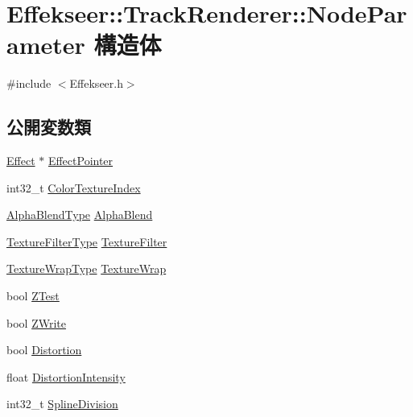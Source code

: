 \hypertarget{struct_effekseer_1_1_track_renderer_1_1_node_parameter}{}\section{Effekseer\+:\+:Track\+Renderer\+:\+:Node\+Parameter 構造体}
\label{struct_effekseer_1_1_track_renderer_1_1_node_parameter}


{\ttfamily \#include $<$Effekseer.\+h$>$}

\subsection*{公開変数類}
\begin{DoxyCompactItemize}
\item 
\mbox{\hyperlink{class_effekseer_1_1_effect}{Effect}} $\ast$ \mbox{\hyperlink{struct_effekseer_1_1_track_renderer_1_1_node_parameter_a00ceee28cf8cea7044e4ad1f57b77638}{Effect\+Pointer}}
\item 
int32\+\_\+t \mbox{\hyperlink{struct_effekseer_1_1_track_renderer_1_1_node_parameter_af56f97c8a66ba32dcbdd511de20101bd}{Color\+Texture\+Index}}
\item 
\mbox{\hyperlink{namespace_effekseer_a8c32fd5b7ec7feed73314b2ae8086949}{Alpha\+Blend\+Type}} \mbox{\hyperlink{struct_effekseer_1_1_track_renderer_1_1_node_parameter_a7de609e147614ce59ff02c45e94659ed}{Alpha\+Blend}}
\item 
\mbox{\hyperlink{namespace_effekseer_ae3518502cfcb4ec4991f13c0b3e4c6ee}{Texture\+Filter\+Type}} \mbox{\hyperlink{struct_effekseer_1_1_track_renderer_1_1_node_parameter_a4fbe911478d0134f0400648deca18a6e}{Texture\+Filter}}
\item 
\mbox{\hyperlink{namespace_effekseer_a5320c83784602974b6278bf1a77b58a3}{Texture\+Wrap\+Type}} \mbox{\hyperlink{struct_effekseer_1_1_track_renderer_1_1_node_parameter_ac5097e042b8ed3d64d7e3724ea43ba9d}{Texture\+Wrap}}
\item 
bool \mbox{\hyperlink{struct_effekseer_1_1_track_renderer_1_1_node_parameter_a28fd38571670062a60b8ea12128c9ff7}{Z\+Test}}
\item 
bool \mbox{\hyperlink{struct_effekseer_1_1_track_renderer_1_1_node_parameter_aee94934faee558a0c2ee1750b1e1051b}{Z\+Write}}
\item 
bool \mbox{\hyperlink{struct_effekseer_1_1_track_renderer_1_1_node_parameter_a2f69bb5e61c65a48a65b48a2c05cafb7}{Distortion}}
\item 
float \mbox{\hyperlink{struct_effekseer_1_1_track_renderer_1_1_node_parameter_a0fa3df9fb51fd6446dd3d5aaaacd0533}{Distortion\+Intensity}}
\item 
int32\+\_\+t \mbox{\hyperlink{struct_effekseer_1_1_track_renderer_1_1_node_parameter_a05f91db977b5cd8fa507fb2079265c72}{Spline\+Division}}
\end{DoxyCompactItemize}


